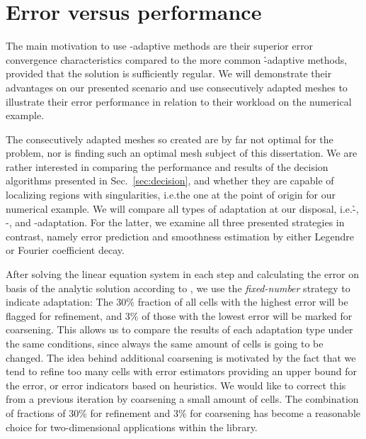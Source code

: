 \section{Error versus performance}
\label{sec:errorvsperformance}



The main motivation to use \hp-adaptive methods are their superior error convergence characteristics compared to the more common \h-adaptive methods, provided that the solution is sufficiently regular. We will demonstrate their advantages on our presented scenario and use consecutively adapted meshes to illustrate their error performance in relation to their workload on the numerical example.


The consecutively adapted meshes so created are by far not optimal for the problem, nor is finding such an optimal mesh subject of this dissertation. We are rather interested in comparing the performance and results of the decision algorithms presented in Sec.~\ref{sec:decision}, and whether they are capable of localizing regions with singularities, i.e.\@ the one at the point of origin for our numerical example. We will compare all types of adaptation at our disposal, i.e.\@ \h-, \p-, and \hp-adaptation. For the latter, we examine all three presented strategies in contrast, namely error prediction and smoothness estimation by either Legendre or Fourier coefficient decay.

After solving the linear equation system in each step and calculating the error on basis of the analytic solution according to \textcite{kelly1983}, we use the \textit{fixed-number} strategy to indicate adaptation: The 30\% fraction of all cells with the highest error will be flagged for refinement, and 3\% of those with the lowest error will be marked for coarsening. This allows us to compare the results of each adaptation type under the same conditions, since always the same amount of cells is going to be changed. The idea behind additional coarsening is motivated by the fact that we tend to refine too many cells with error estimators providing an upper bound for the error, or error indicators based on heuristics. We would like to correct this from a previous iteration by coarsening a small amount of cells. The combination of fractions of 30\% for refinement and 3\% for coarsening has become a reasonable choice for two-dimensional applications within the \dealii{} library.

